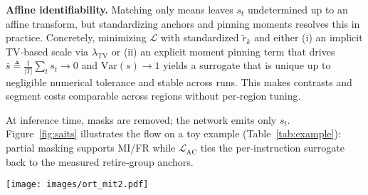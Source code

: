 \textbf{Affine identifiability.} Matching only means leaves \(s_t\) undetermined up to an affine transform, but standardizing anchors and pinning moments resolves this in practice. Concretely, minimizing \(\mathcal{L}\) with standardized \(\tilde{r}_k\) and either (i) an implicit TV‑based scale via \(\lambda_{\mathrm{TV}}\) or (ii) an explicit moment pinning term that drives \(\bar{s}\!\triangleq\!\tfrac{1}{|T|}\sum_ts_t\!\to\!0\) and \(\mathrm{Var}(s)\!\to\!1\) yields a surrogate that is unique up to negligible numerical tolerance and stable across runs. This makes contrasts and segment costs comparable across regions without per‑region tuning.

At inference time, masks are removed; the network emits only \(s_t\). Figure~\ref{fig:saits} illustrates the flow on a toy example (Table~\ref{tab:example}): partial masking supports MI/FR while \(\mathcal{L}_{\mathrm{AC}}\) ties the per‑instruction surrogate back to the measured retire‑group anchors.

\begin{table}[!htbp]
\centering
\small
\caption{Example of profiled dataset from an initial simulation  with group \emph{anchors} for training.}
\label{tab:example}
\end{table}


\begin{figure*}[!htbp]
\centering
\texttt{[image: images/ort\_mit2.pdf]}
\caption{End‑to‑end training flow used in \name. Inputs are instruction features \(u_t\) and retire‑group anchors \(r_k\) from a single profiling pass. During training we (i) randomly mask feature subsets (MI) while retaining others (FR), (ii) use a bidirectional Transformer to reconstruct \(\tilde{u}_t\) and predict a contiguous per‑instruction Phase‑Transition Surrogate \(s_t\), and (iii) enforce group‑average matching (GAM) so that the within‑group mean \(\mu_k(s)\) equals the standardized anchor \(\tilde{r}_k\). A total‑variation prior encourages piecewise smooth \(s_t\). At inference, masks are removed and only \(s_t\) is emitted; in the downstream pipeline, \(s_t\) is passed to \cpd\ to locate compact phase boundaries for budgeted pruning. }
\label{fig:saits}
\end{figure*}


